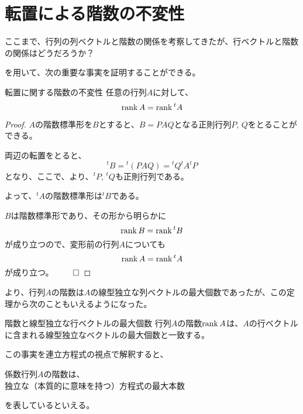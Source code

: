\documentclass[../../../topic_linear-algebra]{subfiles}
\begin{document}
\sectionline
\section{転置による階数の不変性}

ここまで、行列の列ベクトルと階数の関係を考察してきたが、行ベクトルと階数の関係はどうだろうか？

\br

を用いて、次の重要な事実を証明することができる。

\begin{theorem*}{転置に関する階数の不変性}
  任意の行列$A$に対して、
  \begin{equation*}
    \rank A = \rank {}^t A
  \end{equation*}
\end{theorem*}

\begin{proof}
  $A$の階数標準形を$B$とすると、$B=PAQ$となる正則行列$P,\,Q$をとることができる。

  両辺の転置をとると、
  \begin{equation*}
    {}^t B = {}^t (PAQ) = {}^t Q {}^t A {}^t P
  \end{equation*}
  となり、ここで、より、${}^t P,\,{}^t Q$も正則行列である。

  よって、${}^tA$の階数標準形は${}^t B$である。

  \br

  $B$は階数標準形であり、その形から明らかに
  \begin{equation*}
    \rank B = \rank {}^t B
  \end{equation*}
  が成り立つので、変形前の行列$A$についても
  \begin{equation*}
    \rank A = \rank {}^t A
  \end{equation*}
  が成り立つ。 $\qed$
\end{proof}

\br

より、行列$A$の階数は$A$の線型独立な列ベクトルの最大個数であったが、この定理から次のこともいえるようになった。

\begin{theorem*}{階数と線型独立な行ベクトルの最大個数}
  行列$A$の階数$\rank A$は、$A$の行ベクトルに含まれる線型独立なベクトルの最大個数と一致する。
\end{theorem*}

\br

この事実を連立方程式の視点で解釈すると、
\begin{emphabox}
  \begin{spacebox}
    \begin{center}
      係数行列$A$の階数は、\\
      独立な（本質的に意味を持つ）方程式の最大本数
    \end{center}
  \end{spacebox}
\end{emphabox}
を表しているといえる。
\end{document}
